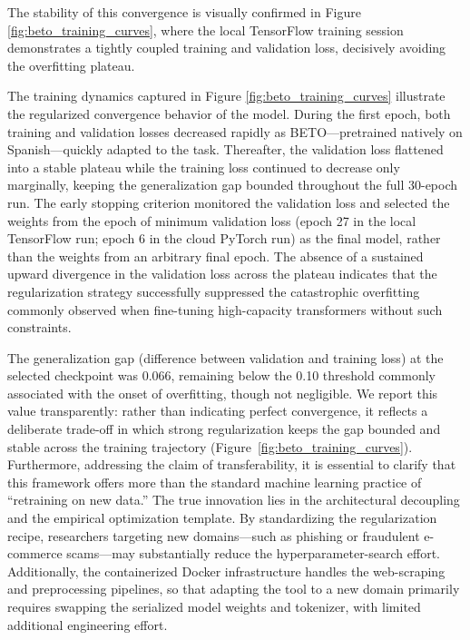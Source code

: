 \documentclass[informatics,article,accept,pdftex,moreauthors]{Definitions/mdpi}
\begin{document}
The stability of this convergence is visually confirmed in Figure \ref{fig:beto_training_curves}, where the local TensorFlow training session demonstrates a tightly coupled training and validation loss, decisively avoiding the overfitting plateau. 

The training dynamics captured in Figure \ref{fig:beto_training_curves} illustrate the regularized convergence behavior of the model. During the first epoch, both training and validation losses decreased rapidly as BETO—pretrained natively on Spanish—quickly adapted to the task. Thereafter, the validation loss flattened into a stable plateau while the training loss continued to decrease only marginally, keeping the generalization gap bounded throughout the full 30-epoch run. The early stopping criterion monitored the validation loss and selected the weights from the epoch of minimum validation loss (epoch 27 in the local TensorFlow run; epoch 6 in the cloud PyTorch run) as the final model, rather than the weights from an arbitrary final epoch. The absence of a sustained upward divergence in the validation loss across the plateau indicates that the regularization strategy successfully suppressed the catastrophic overfitting commonly observed when fine-tuning high-capacity transformers without such constraints.


The generalization gap (difference between validation and training loss) at the selected checkpoint was 0.066, remaining below the 0.10 threshold commonly associated with the onset of overfitting, though not negligible. We report this value transparently: rather than indicating perfect convergence, it reflects a deliberate trade-off in which strong regularization keeps the gap bounded and stable across the training trajectory (Figure~\ref{fig:beto_training_curves}). Furthermore, addressing the claim of transferability, it is essential to clarify that this framework offers more than the standard machine learning practice of ``retraining on new data.'' The true innovation lies in the architectural decoupling and the empirical optimization template. By standardizing the regularization recipe, researchers targeting new domains—such as phishing or fraudulent e-commerce scams—may substantially reduce the hyperparameter-search effort. Additionally, the containerized Docker infrastructure handles the web-scraping and preprocessing pipelines, so that adapting the tool to a new domain primarily requires swapping the serialized model weights and tokenizer, with limited additional \linebreak  engineering effort.
\end{document}
